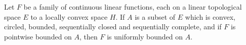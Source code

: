 Let $F$ be a family of continuous linear functions, each on a linear topological space $E$ to a locally convex space $H$. If $A$ is a subset of $E$ which is convex, circled, bounded, sequentially closed and sequentially complete, and if $F$ is pointwise bounded on $A$, then $F$ is uniformly bounded on $A$.

